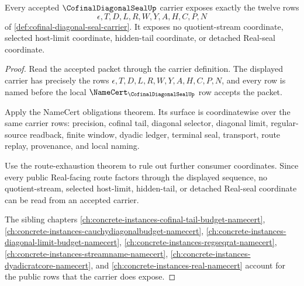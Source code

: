 \begin{theorem}
\label{thm:cofinal-diagonal-seal-carrier-row-readback}
Every accepted $\CofinalDiagonalSealUp$ carrier exposes exactly the twelve rows
$$
\epsilon,T,D,L,R,W,Y,A,H,C,P,N
$$
of \autoref{def:cofinal-diagonal-seal-carrier}. It exposes no quotient-stream coordinate, selected host-limit coordinate, hidden-tail coordinate, or detached Real-seal coordinate.
\end{theorem}
\begin{proof}
Read the accepted packet through the carrier definition. The displayed carrier has precisely the rows $\epsilon,T,D,L,R,W,Y,A,H,C,P,N$, and every row is named before the local $\NameCert_{\CofinalDiagonalSealUp}$ row accepts the packet.

Apply the NameCert obligations theorem. Its surface is coordinatewise over the same carrier rows: precision, cofinal tail, diagonal selector, diagonal limit, regular-source readback, finite window, dyadic ledger, terminal seal, transport, route replay, provenance, and local naming.

Use the route-exhaustion theorem to rule out further consumer coordinates. Since every public Real-facing route factors through the displayed sequence, no quotient-stream, selected host-limit, hidden-tail, or detached Real-seal coordinate can be read from an accepted carrier.

The sibling chapters \autoref{ch:concrete-instances-cofinal-tail-budget-namecert}, \autoref{ch:concrete-instances-cauchydiagonalbudget-namecert}, \autoref{ch:concrete-instances-diagonal-limit-budget-namecert}, \autoref{ch:concrete-instances-regseqrat-namecert}, \autoref{ch:concrete-instances-streamname-namecert}, \autoref{ch:concrete-instances-dyadicratcore-namecert}, and \autoref{ch:concrete-instances-real-namecert} account for the public rows that the carrier does expose.
\end{proof}

